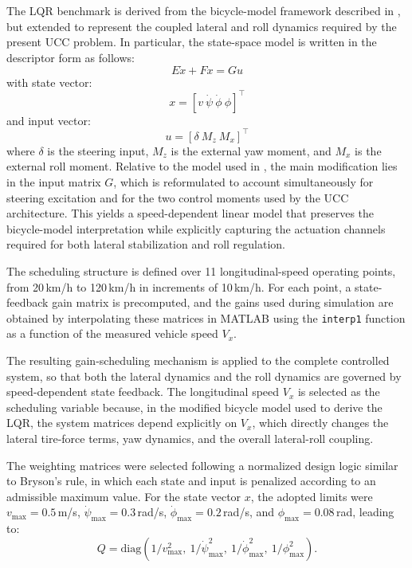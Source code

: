 \documentclass[sn-chicago,iicol]{sn-jnl}
\theoremstyle{thmstyleone}%
\theoremstyle{thmstyletwo}%
\theoremstyle{thmstylethree}%
\begin{document}
The LQR benchmark is derived from the bicycle-model framework described 
in \citep{Arronte2023}, but extended to represent the coupled lateral and 
roll dynamics required by the present UCC problem. In particular, the 
state-space model is written in the descriptor form as follows:
\begin{equation*}
E\dot{x}+Fx=Gu
\end{equation*}
\noindent with state vector:
\begin{equation*}
x=[v\ \dot{\psi}\ \dot{\phi}\ \phi]^{\top}
\end{equation*}
\noindent and input vector:
\begin{equation*}
u=[\delta\ M_z\ M_x]^{\top}
\end{equation*}
where $\delta$ is the steering input, $M_z$ is the external yaw moment, and $M_x$ is the external roll moment. 
Relative to the model used in \citep{Arronte2023}, the main modification 
lies in the input matrix $G$, which is reformulated to account 
simultaneously for steering excitation and for the two control moments 
used by the UCC architecture. This yields a speed-dependent linear model 
that preserves the bicycle-model interpretation while explicitly 
capturing the actuation channels required for both lateral stabilization 
and roll regulation.

The scheduling structure is defined over 11 longitudinal-speed operating 
points, from 20\,km/h to 120\,km/h in increments of 10\,km/h. For each 
point, a state-feedback gain matrix is precomputed, and the gains used 
during simulation are obtained by interpolating these matrices in 
MATLAB using the \texttt{interp1} function as a function of the measured 
vehicle speed $V_x$. 

The resulting gain-scheduling mechanism is applied 
to the complete controlled system, so that both the lateral dynamics and 
the roll dynamics are governed by speed-dependent state feedback. The 
longitudinal speed $V_x$ is selected as the scheduling variable because, 
in the modified bicycle model used to derive the LQR, the system 
matrices depend explicitly on $V_x$, which directly changes the lateral 
tire-force terms, yaw dynamics, and the overall lateral-roll coupling.

The weighting matrices were selected following a normalized design logic 
similar to Bryson's rule, in which each state and input is penalized 
according to an admissible maximum value. For the state vector 
$x$, the adopted limits were 
$v_{\max}=0.5$\,m/s, $\dot{\psi}_{\max}=0.3$\,rad/s, 
$\dot{\phi}_{\max}=0.2$\,rad/s, and $\phi_{\max}=0.08$\,rad, leading to:
\begin{equation*}
Q=\mathrm{diag}(1/v_{\max}^2,\ 1/\dot{\psi}_{\max}^2,\ 
1/\dot{\phi}_{\max}^2,\ 1/\phi_{\max}^2).
\end{equation*} 
\end{document}
